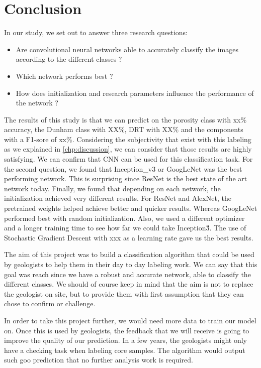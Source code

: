 \chapter{Conclusion}\label{chp:conclusion}
In our study, we set out to answer three research questions: 
\begin{itemize}
    \item Are convolutional neural networks able to accurately classify the images according to the different classes ?
    \item Which network performs best ?
    \item How does initialization and research parameters influence the performance of the network ?
\end{itemize}


The results of this study is that we can predict on the porosity class with xx\% accuracy, the Dunham class with XX\%, DRT with XX\% and the components with a F1-sore of xx\%. Considering the subjectivity that exist with this labeling as we explained in \ref{chp:discussion}, we can consider that those results are highly satisfying. We can confirm that CNN can be used for this classification task.
For the second question, we found that Inception\_v3 or GoogLeNet was the best performing network. This is surprising since ResNet is the best state of the art network today. 
Finally, we found  that depending on each network, the initialization achieved very different results. For ResNet and AlexNet, the pretrained weights helped achieve better and quicker results. Whereas GoogLeNet performed best with random initialization. Also, we used a different optimizer and a longer training time to see how far we could take Inception\v3. The use of Stochastic Gradient Descent with xxx as a learning rate gave us the best results.

The aim of this project was to build a classification algorithm that could be used by geologists to help them in their day to day labeling work. We can say that this goal was reach since we have a robust and accurate network, able to classify the different classes. We should of course keep in mind that the aim is not to replace the geologist on site, but to provide them with first assumption that they can chose to confirm or challenge. 

In order to take this project further, we would need more data to train our model on. Once this is used by geologists, the feedback that we will receive is going to improve the quality of our prediction. In a few years, the geologists might only have a checking task when labeling core samples. The algorithm would output such goo prediction that no further analysis work is required.  
